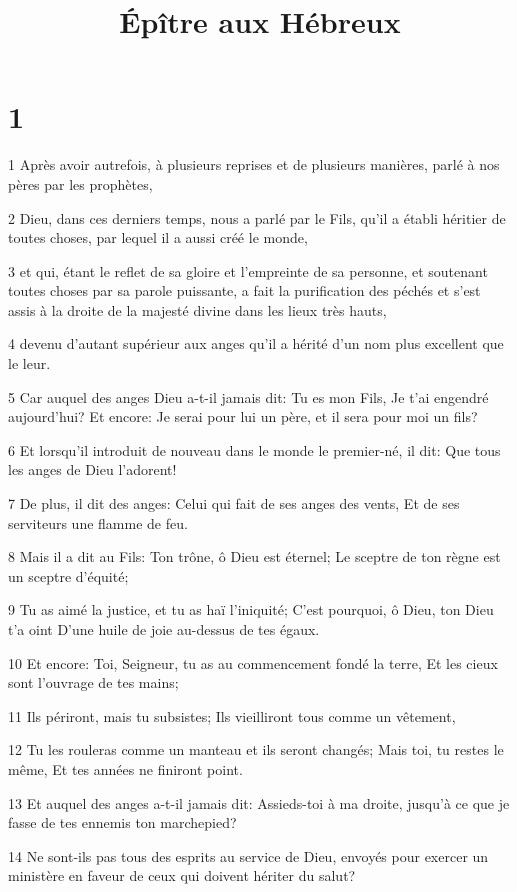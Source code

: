 

\title{Épître aux Hébreux}


\chapter{1}

\par 1 Après avoir autrefois, à plusieurs reprises et de plusieurs manières, parlé à nos pères par les prophètes,
\par 2 Dieu, dans ces derniers temps, nous a parlé par le Fils, qu'il a établi héritier de toutes choses, par lequel il a aussi créé le monde,
\par 3 et qui, étant le reflet de sa gloire et l'empreinte de sa personne, et soutenant toutes choses par sa parole puissante, a fait la purification des péchés et s'est assis à la droite de la majesté divine dans les lieux très hauts,
\par 4 devenu d'autant supérieur aux anges qu'il a hérité d'un nom plus excellent que le leur.
\par 5 Car auquel des anges Dieu a-t-il jamais dit: Tu es mon Fils, Je t'ai engendré aujourd'hui? Et encore: Je serai pour lui un père, et il sera pour moi un fils?
\par 6 Et lorsqu'il introduit de nouveau dans le monde le premier-né, il dit: Que tous les anges de Dieu l'adorent!
\par 7 De plus, il dit des anges: Celui qui fait de ses anges des vents, Et de ses serviteurs une flamme de feu.
\par 8 Mais il a dit au Fils: Ton trône, ô Dieu est éternel; Le sceptre de ton règne est un sceptre d'équité;
\par 9 Tu as aimé la justice, et tu as haï l'iniquité; C'est pourquoi, ô Dieu, ton Dieu t'a oint D'une huile de joie au-dessus de tes égaux.
\par 10 Et encore: Toi, Seigneur, tu as au commencement fondé la terre, Et les cieux sont l'ouvrage de tes mains;
\par 11 Ils périront, mais tu subsistes; Ils vieilliront tous comme un vêtement,
\par 12 Tu les rouleras comme un manteau et ils seront changés; Mais toi, tu restes le même, Et tes années ne finiront point.
\par 13 Et auquel des anges a-t-il jamais dit: Assieds-toi à ma droite, jusqu'à ce que je fasse de tes ennemis ton marchepied?
\par 14 Ne sont-ils pas tous des esprits au service de Dieu, envoyés pour exercer un ministère en faveur de ceux qui doivent hériter du salut?

